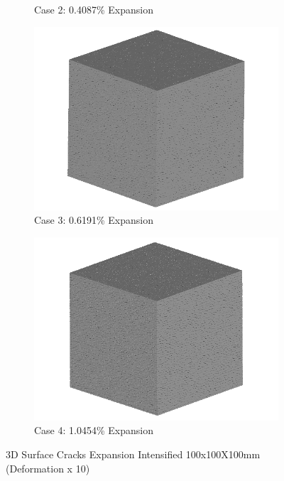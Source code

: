 \begin{figure}[ht!]
\begin{subfigure}{.5\textwidth}
    \caption{Case 2: 0.4087\% Expansion}
    \end{subfigure}%
    \begin{subfigure}{.5\textwidth}
      \centering
      \includegraphics[width=.8\linewidth]{Files/exp_3D/DEF/A30X-1C_3_3d.png}
    \caption{Case 3: 0.6191\% Expansion}
    \end{subfigure}
    \begin{subfigure}{.5\textwidth}
      \centering
      \includegraphics[width=.8\linewidth]{Files/exp_3D/DEF/A30X-1C_4_3d.png}
    \caption{Case 4: 1.0454\% Expansion}
    \end{subfigure}%

  \caption{3D Surface Cracks Expansion Intensified 100x100X100mm (Deformation x 10)}
  \label{fig:DEF_A30X-1C_3D}
\end{figure}

